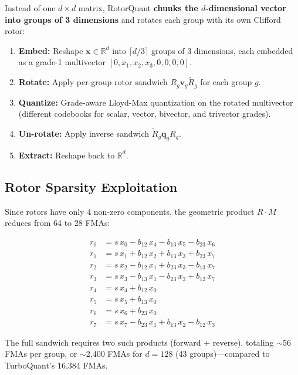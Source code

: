 \documentclass[10pt,twocolumn]{article}
\begin{document}
Instead of one $d \times d$ matrix, RotorQuant \textbf{chunks the $d$-dimensional vector into groups of 3 dimensions} and rotates each group with its own Clifford rotor:

\begin{enumerate}[nosep]
  \item \textbf{Embed:} Reshape $\mathbf{x} \in \mathbb{R}^d$ into $\lceil d/3 \rceil$ groups of 3 dimensions, each embedded as a grade-1 multivector $[0, x_1, x_2, x_3, 0, 0, 0, 0]$.
  \item \textbf{Rotate:} Apply per-group rotor sandwich $R_g \mathbf{v}_g \tilde{R}_g$ for each group $g$.
  \item \textbf{Quantize:} Grade-aware Lloyd-Max quantization on the rotated multivector (different codebooks for scalar, vector, bivector, and trivector grades).
  \item \textbf{Un-rotate:} Apply inverse sandwich $\tilde{R}_g \mathbf{q}_g R_g$.
  \item \textbf{Extract:} Reshape back to $\mathbb{R}^d$.
\end{enumerate}

\subsection{Rotor Sparsity Exploitation}

Since rotors have only 4 non-zero components, the geometric product $R \cdot M$ reduces from 64 to 28 FMAs:

\begin{align}
  r_0 &= s\,x_0 - b_{12}\,x_4 - b_{13}\,x_5 - b_{23}\,x_6 \nonumber\\
  r_1 &= s\,x_1 + b_{12}\,x_2 + b_{13}\,x_3 + b_{23}\,x_7 \nonumber\\
  r_2 &= s\,x_2 - b_{12}\,x_1 + b_{23}\,x_3 - b_{13}\,x_7 \nonumber\\
  r_3 &= s\,x_3 - b_{13}\,x_1 - b_{23}\,x_2 + b_{12}\,x_7 \label{eq:sparse_gp}\\
  r_4 &= s\,x_4 + b_{12}\,x_0 \nonumber\\
  r_5 &= s\,x_5 + b_{13}\,x_0 \nonumber\\
  r_6 &= s\,x_6 + b_{23}\,x_0 \nonumber\\
  r_7 &= s\,x_7 - b_{23}\,x_1 + b_{13}\,x_2 - b_{12}\,x_3 \nonumber
\end{align}

The full sandwich requires two such products (forward + reverse), totaling $\sim$56 FMAs per group, or $\sim$2,400 FMAs for $d=128$ (43 groups)---compared to TurboQuant's 16,384 FMAs.
\end{document}
